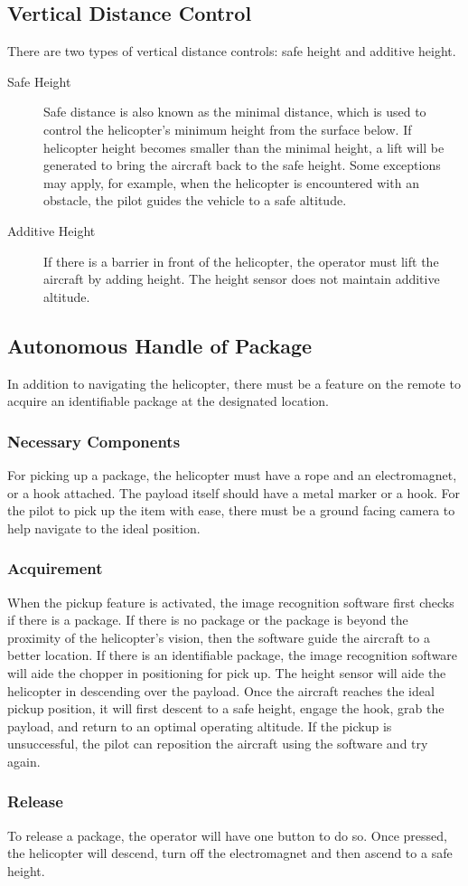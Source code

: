 \documentclass[onecolumn, draftclsnofoot,10pt, compsoc]{IEEEtran}
\begin{document}
\subsection{Vertical Distance Control}
There are two types of vertical distance controls: safe height and additive height.
\begin{description}
\item [Safe Height] Safe distance is also known as the minimal distance, which is used to control the helicopter's minimum height from the surface below. If helicopter height becomes smaller than the minimal height, a lift will be generated to bring the aircraft back to the safe height. Some exceptions may apply, for example, when the helicopter is encountered with an obstacle, the pilot guides the vehicle to a safe altitude.
\item [Additive Height] If there is a barrier in front of the helicopter, the operator must lift the aircraft by adding height. The height sensor does not maintain additive altitude.
\end{description}

\subsection{Autonomous Handle of Package}
In addition to navigating the helicopter, there must be a feature on the remote to acquire an identifiable package at the designated location.

\subsubsection{Necessary Components}
For picking up a package, the helicopter must have a rope and an electromagnet, or a hook attached. The payload itself should have a metal marker or a hook. For the pilot to pick up the item with ease, there must be a ground facing camera to help navigate to the ideal position.

\subsubsection{Acquirement}
When the pickup feature is activated, the image recognition software first checks if there is a package. If there is no package or the package is beyond the proximity of the helicopter's vision, then the software guide the aircraft to a better location. If there is an identifiable package, the image recognition software will aide the chopper in positioning for pick up. The height sensor will aide the helicopter in descending over the payload. Once the aircraft reaches the ideal pickup position, it will first descent to a safe height,  engage the hook, grab the payload, and return to an optimal operating altitude. If the pickup is unsuccessful, the pilot can reposition the aircraft using the software and try again.

\subsubsection{Release}
To release a package, the operator will have one button to do so. Once pressed, the helicopter will descend, turn off the electromagnet and then ascend to a safe height.
\end{document}
